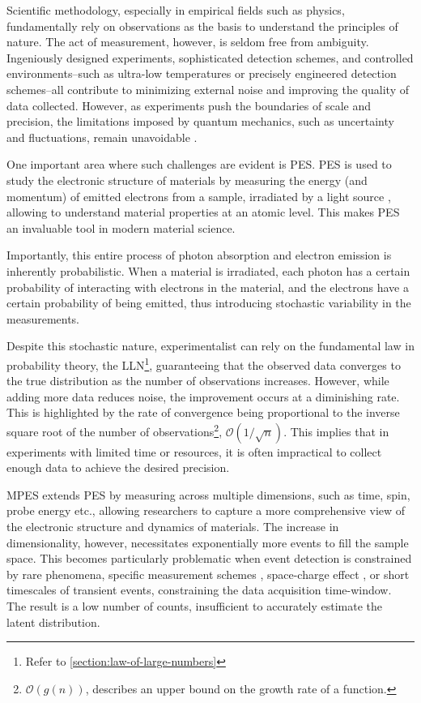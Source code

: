Scientific methodology, especially in empirical fields such as physics, fundamentally rely on observations as the basis to understand the principles of nature. The act of measurement, however, is seldom free from ambiguity. Ingeniously designed experiments, sophisticated detection schemes, and controlled environments--such as ultra-low temperatures or precisely engineered detection schemes--all contribute to minimizing external noise and improving the quality of data collected. However, as experiments push the boundaries of scale and precision, the limitations imposed by quantum mechanics, such as uncertainty and fluctuations, remain unavoidable \cite{heisenbergPhysicalPrinciplesQuantum2009,sakuraiModernQuantumMechanics2020,binneyPhysicsQuantumMechanics2014}.

One important area where such challenges are evident is \gls{PES}. \Gls{PES} is used to study the electronic structure of materials by measuring the energy (and momentum) of emitted electrons from a sample, irradiated by a light source \cite{cardonaGeneralPrinciples1978}, allowing to understand material properties at an atomic level. This makes \gls{PES} an invaluable tool in modern material science. 

Importantly, this entire process of photon absorption and electron emission is inherently probabilistic. When a material is irradiated, each photon has a certain probability of interacting with electrons in the material, and the electrons have a certain probability of being emitted, thus introducing stochastic variability in the measurements.

Despite this stochastic nature, experimentalist can rely on the fundamental law in probability theory, the \gls{LLN}\footnote{Refer to \cref{section:law-of-large-numbers}}, guaranteeing that the observed data converges to the true distribution as the number of observations increases. However, while adding more data reduces \gls{noise}, the improvement occurs at a diminishing rate. This is highlighted by the rate of convergence being proportional to the inverse square root of the number of observations\footnote{$\mathcal{O}(g(n))$, describes an upper bound on the growth rate of a function.}, $\mathcal{O}(1/\sqrt{n})$. This implies that in experiments with limited time or resources, it is often impractical to collect enough data to achieve the desired precision.

\Gls{MPES} extends \gls{PES} by measuring across multiple dimensions, such as time, spin, probe energy etc., allowing researchers to capture a more comprehensive view of the electronic structure and dynamics of materials. The increase in dimensionality, however, necessitates exponentially more events to fill the sample space. This becomes particularly problematic when event detection is constrained by rare phenomena, specific measurement schemes \cite{maklarQuantitativeComparisonTimeflight2020}, space-charge effect \cite{schonhenseMultidimensionalPhotoemissionSpectroscopy2018}, or short timescales of transient events, constraining the data acquisition time-window. The result is a low number of counts, insufficient to accurately estimate the \gls{latent} distribution. 

